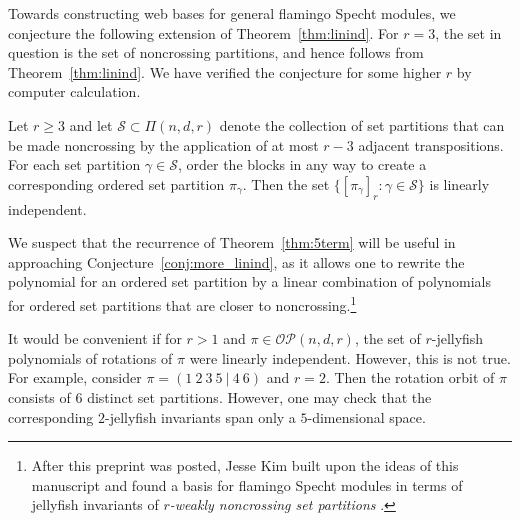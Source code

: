 \documentclass[ALCO, Unicode]{cedram}
\numberwithin{equation}{section}
\newcommand{\setpart}{\Pi}
\newcommand{\ordsetpart}{\mathcal{OP}}
\begin{document}
Towards constructing web bases for general flamingo Specht modules, we conjecture the following extension of Theorem~\ref{thm:linind}.
For $r = 3$, the set in question is the set of noncrossing partitions, and hence follows from Theorem~\ref{thm:linind}. We have verified the conjecture for some higher $r$ by computer calculation.
\begin{conjecture}\label{conj:more_linind}
Let $r \geq 3$ and let $\mathscr{S} \subset \setpart(n,d,r)$ denote the collection of set partitions that can be made noncrossing by the application of at most $r-3$ adjacent transpositions. For each set partition $\gamma \in \mathscr{S}$, order the blocks in any way to create a corresponding ordered set partition $\pi_\gamma$. Then the set $\{ [\pi_\gamma]_r : \gamma \in \mathscr{S} \}$ is linearly independent.
\end{conjecture}

We suspect that the recurrence of Theorem~\ref{thm:5term} will be useful in approaching Conjecture~\ref{conj:more_linind}, as it allows one to rewrite the polynomial for an ordered set partition by a linear combination of polynomials for ordered set partitions that are closer to noncrossing.\footnote{After this preprint was posted, Jesse Kim built upon the ideas of this manuscript and found a basis for flamingo Specht modules in terms of jellyfish invariants of \emph{$r$-weakly noncrossing set partitions} \cite{Kim:3row}.}


It would be convenient if for $r>1$ and $\pi \in \ordsetpart(n,d,r)$, the set of $r$-jellyfish polynomials of rotations of $\pi$ were linearly independent. However, this is not true. For example, consider $\pi = ( 1 \ 2 \ 3 \ 5 \ | \ 4 \ 6 )$ and $r=2$. Then the rotation orbit of $\pi$ consists of $6$ distinct set partitions. However, one may check that the corresponding $2$-jellyfish invariants span only a $5$-dimensional space.




\end{document}
